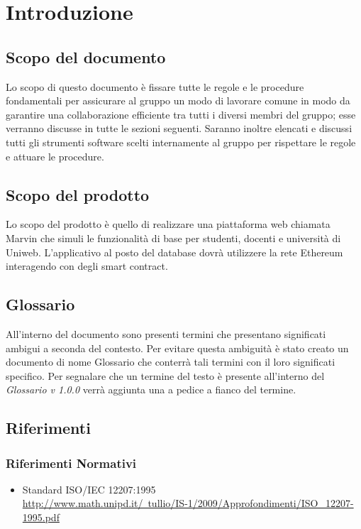 \documentclass[NormeDiProgetto.tex]{subfiles}
\begin{document}
\chapter{Introduzione}

\section{Scopo del documento}
Lo scopo di questo documento è fissare tutte le regole e le procedure fondamentali per assicurare al gruppo un modo di lavorare comune in modo da garantire una collaborazione efficiente tra tutti i diversi membri del gruppo; esse verranno discusse in tutte le sezioni seguenti. Saranno inoltre elencati e discussi tutti gli strumenti software scelti internamente al gruppo per rispettare le regole e attuare le procedure.
\section{Scopo del prodotto}
Lo scopo del prodotto è quello di realizzare una piattaforma web chiamata Marvin che simuli le funzionalità di base per studenti, docenti e università di Uniweb. L'applicativo al posto del database dovrà utilizzere la rete Ethereum interagendo con degli smart contract.
\section{Glossario}
All'interno del documento sono presenti termini che presentano significati ambigui a seconda del contesto. Per evitare questa ambiguità è stato creato un documento di nome Glossario che conterrà tali termini con il loro significati specifico. Per segnalare che un termine del testo è presente all'interno del \textit{Glossario v 1.0.0} verrà aggiunta una \Glossario{} a pedice a fianco del termine.
\section{Riferimenti}
\subsection{Riferimenti Normativi}
\begin{itemize}
	\item Standard ISO/IEC 12207:1995\\ \href{http://www.math.unipd.it/~tullio/IS-1/2009/Approfondimenti/ISO\_12207-1995.pdf}{http://www.math.unipd.it/~tullio/IS-1/2009/Approfondimenti/ISO\_12207-1995.pdf}
\end{itemize}
\end{document}
